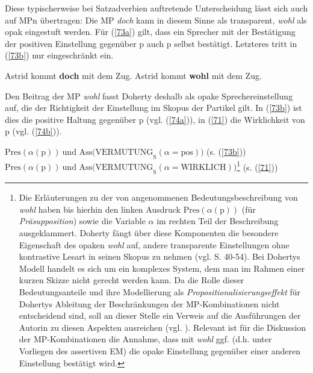 Diese typischerweise bei Satzadverbien auftretende Unterscheidung lässt sich auch auf MPn übertragen: Die MP \textit{doch} kann in diesem Sinne als transparent, \textit{wohl} als opak eingestuft werden. Für (\ref{73a}) gilt, dass ein Sprecher mit der Bestätigung der positiven Einstellung gegenüber p auch p selbst bestätigt. Letzteres tritt in (\ref{73b}) nur eingeschränkt ein.
\begin{exe}
	\ex\label{73} 
		\begin{xlist}	
			\ex\label{73a} Astrid kommt \textbf{doch} mit dem Zug.
			\ex\label{73b} Astrid kommt \textbf{wohl} mit dem Zug.
		\end{xlist}
\end{exe}
Den Beitrag der MP \textit{wohl} fasst Doherty deshalb als opake Sprechereinstellung auf, die der Richtigkeit der Einstellung im Skopus der Partikel gilt. In (\ref{73b}) ist dies die positive Haltung gegenüber p (vgl. (\ref{74a})), in (\ref{71}) die Wirklichkeit von p (vgl. (\ref{74b})).
\begin{exe}
	\ex\label{74} 
		\begin{xlist}	
			\ex\label{74a} $\textrm{Pres}(\alpha(\textrm{p})) \ \textrm{und Ass(VERMUTUNG}_{\textrm{S}}(\alpha = \textrm{pos}))$	(s. (\ref{73b}))
			\ex\label{74b} $\textrm{Pres}(\alpha(\textrm{p})) \ \textrm{und Ass(VERMUTUNG}_{\textrm{S}}(\alpha = \textrm{WIRKLICH}))$\footnote{Die Erläuterungen zu der von \citet{Doherty1985} angenommenen Bedeutungsbeschreibung von \textit{wohl} haben bis hierhin den linken Ausdruck $\textrm{Pres}(\alpha(\textrm{p}))$ (für \textit{Präsupposition}) sowie die Variable $\alpha$ im rechten Teil der Beschreibung ausgeklammert. Doherty fängt über diese Komponenten die besondere Eigenschaft des opaken \textit{wohl} auf, andere transparente Einstellungen ohne kontrastive Lesart in seinen Skopus zu nehmen (vgl. S. 40-54). Bei Dohertys Modell handelt es sich um ein komplexes System, dem man im Rahmen einer kurzen Skizze nicht gerecht werden kann. Da die Rolle dieser Bedeutungsanteile und ihre Modellierung als \textit{Propositionalisierungseffekt} für Dohertys Ableitung der Beschränkungen der MP-Kombinationen nicht entscheidend sind, soll an dieser Stelle ein Verweis auf die Ausführungen der Autorin zu diesen Aspekten ausreichen (vgl. \citealt[81-82]{Doherty1985}). Relevant ist für die Diskussion der MP-Kombinationen die Annahme, dass mit \textit{wohl} ggf. (d.h. unter Vorliegen des assertiven EM) die opake Einstellung gegenüber einer anderen Einstellung bestätigt wird.} (s. (\ref{71}))
\end{xlist}
\end{exe}

